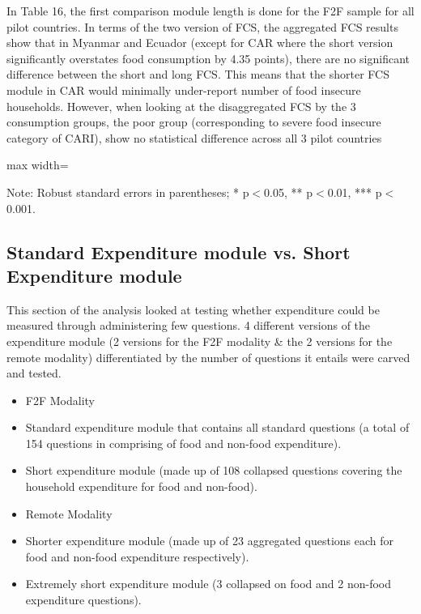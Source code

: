 \documentclass[11pt,harvard]{article}
\begin{document}
In Table 16, the first comparison module length is done for the F2F sample for all pilot countries. In terms of the two version of FCS, the aggregated FCS results show that in Myanmar and Ecuador (except for CAR where the short version significantly overstates food consumption by 4.35 points), there are no significant difference between the short and long FCS. This means that the shorter FCS module in CAR would minimally under-report number of food insecure households. 
However, when looking at the disaggregated FCS by the 3 consumption groups, the poor group (corresponding to severe food insecure category of CARI), show no statistical difference across all 3 pilot countries

\begin{table}[htbp]
	\centering
	\begin{adjustbox}{max width=\textwidth}
		\begin{threeparttable}
			\caption{Impact of Module Length on FCS Reporting}
			\scriptsize
			 
			\label{tab:FCS_F2F_Form_Length_All_Country}
			\begin{tablenotes}
				\item Note: Robust standard errors in parentheses; * p$<$0.05, ** p$<$0.01, *** p$<$0.001. 
			\end{tablenotes}
		\end{threeparttable}
	\end{adjustbox}
\end{table}

\subsection{Standard Expenditure module vs. Short Expenditure module}

This section of the analysis looked at testing whether expenditure could be measured through administering few questions. 4 different versions of the expenditure module (2 versions for the F2F modality \& the 2 versions for the remote modality) differentiated by the number of questions it entails were carved and tested.

\begin{itemize}[label=--, left=1.5em]
	\item F2F Modality
	\item[1.] Standard expenditure module that contains all standard questions (a total of 154 questions in comprising of food and non-food expenditure).
	\item[2.] Short expenditure module (made up of 108 collapsed questions covering the household expenditure for food and non-food).
	\item Remote Modality
	\item[1.] Shorter expenditure module (made up of 23 aggregated questions each for food and non-food expenditure respectively).
	\item[2.] Extremely short expenditure module (3 collapsed on food and 2 non-food expenditure questions).
\end{itemize}
\end{document}
